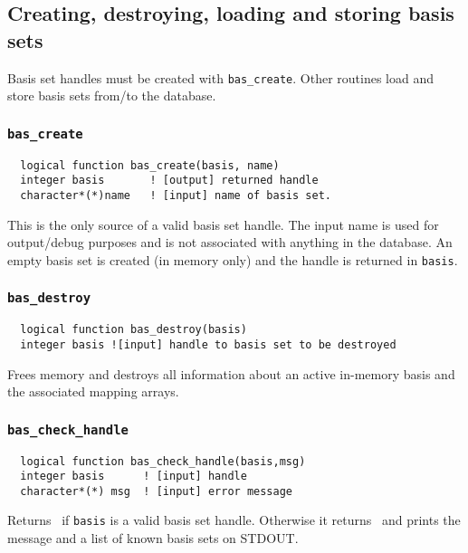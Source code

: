 \subsection{Creating, destroying, loading and storing basis sets}

Basis set handles must be created with \verb+bas_create+.  Other
routines load and store basis sets from/to the database.

\subsubsection{{\tt bas\_create}}
\begin{verbatim}
  logical function bas_create(basis, name)
  integer basis       ! [output] returned handle
  character*(*)name   ! [input] name of basis set.  
\end{verbatim}
This is the only source of a valid basis set handle.  The input name
is used for output/debug purposes and is not associated with anything
in the database.  An empty basis set is created (in memory only) and
the handle is returned in {\tt basis}.

\subsubsection{{\tt bas\_destroy}}
\begin{verbatim}
  logical function bas_destroy(basis)
  integer basis ![input] handle to basis set to be destroyed
\end{verbatim}
Frees memory and destroys all information about an active in-memory basis
and the associated mapping arrays.

\subsubsection{{\tt bas\_check\_handle}}
\begin{verbatim}
  logical function bas_check_handle(basis,msg)
  integer basis      ! [input] handle
  character*(*) msg  ! [input] error message
\end{verbatim}
Returns \TRUE\ if {\tt basis} is a valid basis set handle.  Otherwise
it returns \FALSE\ and prints the message and a list of known basis
sets on STDOUT.

